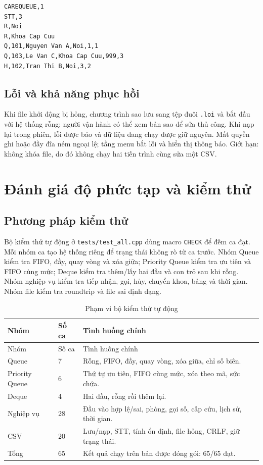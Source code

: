\documentclass[12pt,a4paper,oneside]{report}
\begin{document}
\begin{lstlisting}[caption={Ví dụ định dạng lưu trạng thái}]
CAREQUEUE,1
STT,3
R,Noi
R,Khoa Cap Cuu
Q,101,Nguyen Van A,Noi,1,1
Q,103,Le Van C,Khoa Cap Cuu,999,3
H,102,Tran Thi B,Noi,3,2
\end{lstlisting}

\section{Lỗi và khả năng phục hồi}
Khi file khởi động bị hỏng, chương trình sao lưu sang tệp đuôi \texttt{.loi} và bắt đầu với hệ thống rỗng; người vận hành có thể xem bản sao để sửa thủ công. Khi nạp lại trong phiên, lỗi được báo và dữ liệu đang chạy được giữ nguyên. Mất quyền ghi hoặc đầy đĩa ném ngoại lệ; tầng menu bắt lỗi và hiển thị thông báo. Giới hạn: không khóa file, do đó không chạy hai tiến trình cùng sửa một CSV.

\chapter{Đánh giá độ phức tạp và kiểm thử}
\section{Phương pháp kiểm thử}
Bộ kiểm thử tự động ở \texttt{tests/test\_all.cpp} dùng macro \texttt{CHECK} để đếm ca đạt. Mỗi nhóm ca tạo hệ thống riêng để trạng thái không rò từ ca trước. Nhóm Queue kiểm tra FIFO, đầy, quay vòng và xóa giữa; Priority Queue kiểm tra ưu tiên và FIFO cùng mức; Deque kiểm tra thêm/lấy hai đầu và con trỏ sau khi rỗng. Nhóm nghiệp vụ kiểm tra tiếp nhận, gọi, hủy, chuyển khoa, bảng và thời gian. Nhóm file kiểm tra roundtrip và file sai định dạng.

\begin{longtable}{p{2.4cm}p{1.8cm}p{8.3cm}}
\caption{Phạm vi bộ kiểm thử tự động}\\\toprule
Nhóm & Số ca & Tình huống chính\\\midrule\endfirsthead
\toprule Nhóm & Số ca & Tình huống chính\\\midrule\endhead
Queue & 7 & Rỗng, FIFO, đầy, quay vòng, xóa giữa, chỉ số biên.\\
Priority Queue & 6 & Thứ tự ưu tiên, FIFO cùng mức, xóa theo mã, sức chứa.\\
Deque & 4 & Hai đầu, rỗng rồi thêm lại.\\
Nghiệp vụ & 28 & Đầu vào hợp lệ/sai, phòng, gọi số, cấp cứu, lịch sử, thời gian.\\
CSV & 20 & Lưu/nạp, STT, tính ổn định, file hỏng, CRLF, giữ trạng thái.\\\midrule
Tổng & 65 & Kết quả chạy trên bản được đóng gói: 65/65 đạt.\\\bottomrule
\end{longtable}
\end{document}
